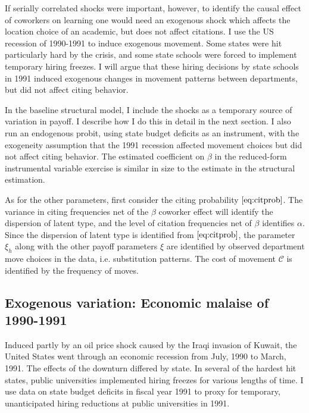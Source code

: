 If serially correlated shocks were important, however, to identify the
causal effect of coworkers on learning one would need an exogenous shock
which affects the location choice of an academic, but does not affect
citations.  I use the US recession of 1990-1991 to induce exogenous
movement. Some states were hit particularly hard by the crisis, and some
state schools were forced to implement temporary hiring freezes. I will
argue that these hiring decisions by state schools in 1991 induced
exogenous changes in movement patterns between departments, but did not
affect citing behavior.

In the baseline structural model, I include the shocks as a temporary
source of variation in payoff. I describe how I do this in detail
in the next section.  I also run an endogenous probit, using state budget
deficits as an instrument, with the exogeneity assumption that the 1991
recession affected movement choices but did not affect citing behavior.\footnotemark{}
The estimated coefficient on $\beta$ in the reduced-form instrumental variable
exercise is similar in size to the estimate in the structural 
estimation.

As for the other parameters, first consider the citing probability
$\eqref{eq:citprob}$. The variance in citing frequencies net of the
$\beta$ coworker effect will identify the dispersion of latent type, and
the level of citation frequencies net of $\beta$ identifies $\alpha$.
Since the dispersion of latent type is identified from
$\eqref{eq:citprob}$, the parameter $\xi_h$ along with the other payoff
parameters $\xi$ are identified by observed department move choices in the data, i.e.
substitution patterns. The cost of movement $\mathcal{C}$ is
identified by the frequency of moves.

\subsection{Exogenous variation: Economic malaise of 1990-1991}

Induced partly by an oil price shock caused by the Iraqi invasion of
Kuwait, the United States went through an economic recession from July,
1990 to March, 1991. The effects of the downturn differed by state.
\citep{wapo1991public, moore1991state} In several of the hardest hit
states, public universities implemented hiring freezes for various
lengths of time.\citep{latimes1991golden, moneymag1991paying, uvt2013pres}
I use data on state budget deficits in fiscal year 1991 to proxy for
temporary, unanticipated hiring reductions at public universities in
1991.\citep{gold1995fiscal}

